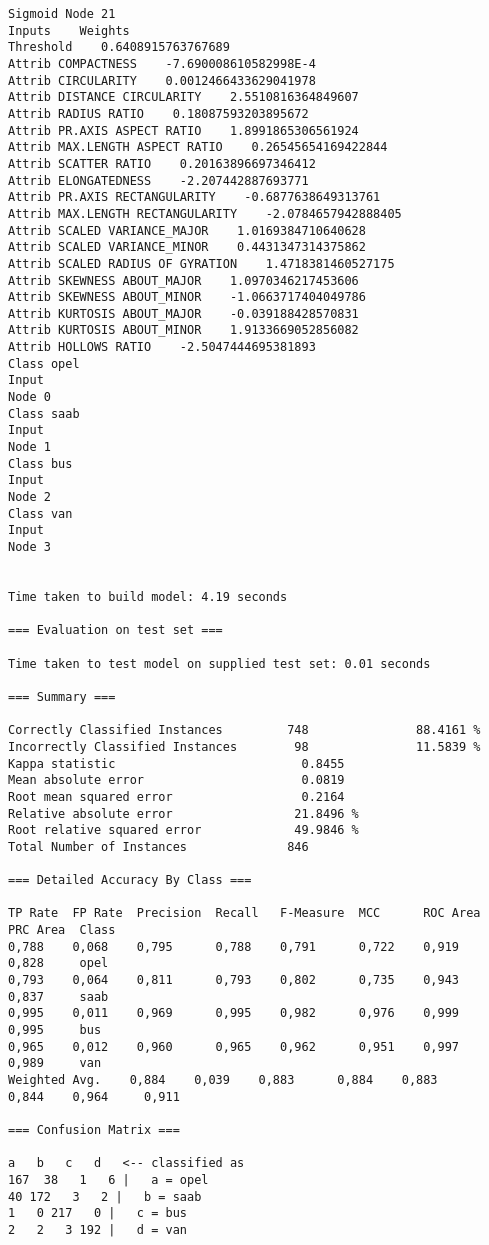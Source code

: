 \documentclass[
	article,			%
	11pt,				%
	oneside,			%
	a4paper,			%
	english,			%
	brazil,				%
	sumario=tradicional
	]{abntex2}
\begin{document}
\begin{lstlisting}
Sigmoid Node 21
Inputs    Weights
Threshold    0.6408915763767689
Attrib COMPACTNESS    -7.690008610582998E-4
Attrib CIRCULARITY    0.0012466433629041978
Attrib DISTANCE CIRCULARITY    2.5510816364849607
Attrib RADIUS RATIO    0.18087593203895672
Attrib PR.AXIS ASPECT RATIO    1.8991865306561924
Attrib MAX.LENGTH ASPECT RATIO    0.26545654169422844
Attrib SCATTER RATIO    0.20163896697346412
Attrib ELONGATEDNESS    -2.207442887693771
Attrib PR.AXIS RECTANGULARITY    -0.6877638649313761
Attrib MAX.LENGTH RECTANGULARITY    -2.0784657942888405
Attrib SCALED VARIANCE_MAJOR    1.0169384710640628
Attrib SCALED VARIANCE_MINOR    0.4431347314375862
Attrib SCALED RADIUS OF GYRATION    1.4718381460527175
Attrib SKEWNESS ABOUT_MAJOR    1.0970346217453606
Attrib SKEWNESS ABOUT_MINOR    -1.0663717404049786
Attrib KURTOSIS ABOUT_MAJOR    -0.039188428570831
Attrib KURTOSIS ABOUT_MINOR    1.9133669052856082
Attrib HOLLOWS RATIO    -2.5047444695381893
Class opel
Input
Node 0
Class saab
Input
Node 1
Class bus
Input
Node 2
Class van
Input
Node 3


Time taken to build model: 4.19 seconds

=== Evaluation on test set ===

Time taken to test model on supplied test set: 0.01 seconds

=== Summary ===

Correctly Classified Instances         748               88.4161 %
Incorrectly Classified Instances        98               11.5839 %
Kappa statistic                          0.8455
Mean absolute error                      0.0819
Root mean squared error                  0.2164
Relative absolute error                 21.8496 %
Root relative squared error             49.9846 %
Total Number of Instances              846     

=== Detailed Accuracy By Class ===

TP Rate  FP Rate  Precision  Recall   F-Measure  MCC      ROC Area  PRC Area  Class
0,788    0,068    0,795      0,788    0,791      0,722    0,919     0,828     opel
0,793    0,064    0,811      0,793    0,802      0,735    0,943     0,837     saab
0,995    0,011    0,969      0,995    0,982      0,976    0,999     0,995     bus
0,965    0,012    0,960      0,965    0,962      0,951    0,997     0,989     van
Weighted Avg.    0,884    0,039    0,883      0,884    0,883      0,844    0,964     0,911     

=== Confusion Matrix ===

a   b   c   d   <-- classified as
167  38   1   6 |   a = opel
40 172   3   2 |   b = saab
1   0 217   0 |   c = bus
2   2   3 192 |   d = van


\end{lstlisting}
\end{document}
